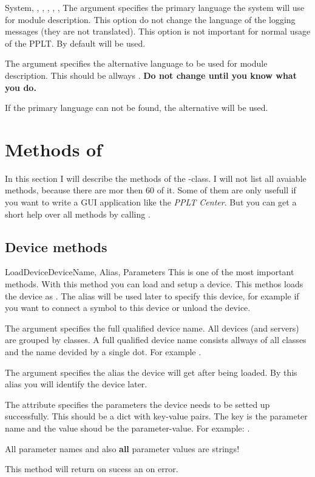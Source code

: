\begin{classdesc}{System}{, , 
, , , 
, }
The argument  specifies the primary language the system will use for
module description. This option do not change the language of the logging 
messages (they are not translated). This option is not important for normal
usage of the PPLT. By default  will be used.

The argument  specifies the alternative language to be used
for module description. This should be allways . \textbf{Do not 
change until you know what you do.} 

If the primary language can not be found, the alternative will be used. 
\end{classdesc}




\section{Methods of }
In this section I will describe the methods of the -class. I 
will not list all avaiable methods, because there are mor then 60 of it. Some
of them are only usefull if you want to write a GUI application like the
\emph{PPLT Center}. But you can get a short help over all methods by calling
. 


\subsection{Device methods}
\begin{methoddesc}[System]{LoadDevice}{DeviceName, Alias, Parameters}
This is one of the most important methods. With this method you can load and
setup a device. This methos loads the device  as . 
The alias will be used later to specify this device, for example if you want
to connect a symbol to this device or unload the device.

The argument  specifies the full qualified device name. All
devices (and servers) are grouped by classes. A full qualified device name
consists allways of all classes and the name devided by a single dot. For
example .

The argument  specifies the alias the device will get after being
loaded. By this alias you will identify the device later.

The attribute  specifies the parameters the device needs to be
setted up successfully. This should be a dict with key-value pairs. The key 
is the parameter name and the value shoud be the parameter-value. For example:
.
\begin{notice}
All parameter names and also \textbf{all} parameter values are strings!
\end{notice}

This method will return  on sucess an  on error.
\end{methoddesc}


